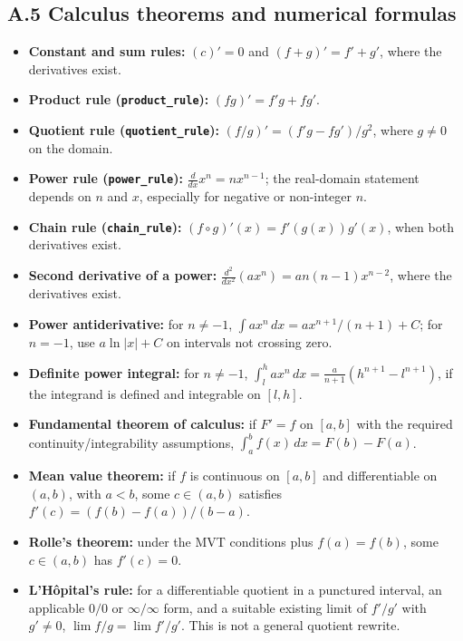 \documentclass[
  10pt,
]{article}
\providecommand{\tightlist}{%
  \setlength{\itemsep}{0pt}\setlength{\parskip}{0pt}}
\begin{document}
\subsection{A.5 Calculus theorems and numerical
formulas}\label{a.5-calculus-theorems-and-numerical-formulas}

\begin{itemize}
\tightlist
\item
  \textbf{Constant and sum rules:} \((c)'=0\) and \((f+g)'=f'+g'\),
  where the derivatives exist.
\item
  \textbf{Product rule (\texttt{product\_rule}):} \((fg)'=f'g+fg'\).
\item
  \textbf{Quotient rule (\texttt{quotient\_rule}):}
  \((f/g)'=(f'g-fg')/g^2\), where \(g\ne0\) on the domain.
\item
  \textbf{Power rule (\texttt{power\_rule}):}
  \(\frac{d}{dx}x^n=nx^{n-1}\); the real-domain statement depends on
  \(n\) and \(x\), especially for negative or non-integer \(n\).
\item
  \textbf{Chain rule (\texttt{chain\_rule}):}
  \((f\circ g)'(x)=f'(g(x))g'(x)\), when both derivatives exist.
\item
  \textbf{Second derivative of a power:}
  \(\frac{d^2}{dx^2}(ax^n)=an(n-1)x^{n-2}\), where the derivatives
  exist.
\item
  \textbf{Power antiderivative:} for \(n\ne-1\),
  \(\int ax^n\,dx=ax^{n+1}/(n+1)+C\); for \(n=-1\), use \(a\ln|x|+C\) on
  intervals not crossing zero.
\item
  \textbf{Definite power integral:} for \(n\ne-1\),
  \(\int_l^h ax^n\,dx=\frac{a}{n+1}(h^{n+1}-l^{n+1})\), if the integrand
  is defined and integrable on \([l,h]\).
\item
  \textbf{Fundamental theorem of calculus:} if \(F'=f\) on \([a,b]\)
  with the required continuity/integrability assumptions,
  \(\int_a^b f(x)\,dx=F(b)-F(a)\).
\item
  \textbf{Mean value theorem:} if \(f\) is continuous on \([a,b]\) and
  differentiable on \((a,b)\), with \(a<b\), some \(c\in(a,b)\)
  satisfies \(f'(c)=(f(b)-f(a))/(b-a)\).
\item
  \textbf{Rolle's theorem:} under the MVT conditions plus \(f(a)=f(b)\),
  some \(c\in(a,b)\) has \(f'(c)=0\).
\item
  \textbf{L'Hôpital's rule:} for a differentiable quotient in a
  punctured interval, an applicable \(0/0\) or \(\infty/\infty\) form,
  and a suitable existing limit of \(f'/g'\) with \(g'\ne0\),
  \(\lim f/g=\lim f'/g'\). This is not a general quotient rewrite.

\end{itemize}
\end{document}
